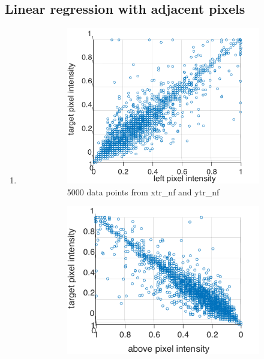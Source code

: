\documentclass{article}
\begin{document}
		\subsection{Linear regression with adjacent pixels}
			\begin{enumerate}[label=(\alph*)]
				\item
				 	\begin{figure}[t]
				 		\caption{}
				 		\begin{subfigure}{0.5\textwidth}
				 			\includegraphics[width=\linewidth]{images/p1-2-a_left_target.png}
				 			\caption{5000 data points from xtr\_nf and ytr\_nf}
				 			\label{fig:p1-2-a_left_target}
				 		\end{subfigure}
				 		\begin{subfigure}{0.5\textwidth}
				 			\includegraphics[width=\linewidth]{images/p1-2-a_above_target.png}

\end{subfigure}
\end{figure}
\end{enumerate}
\end{document}
